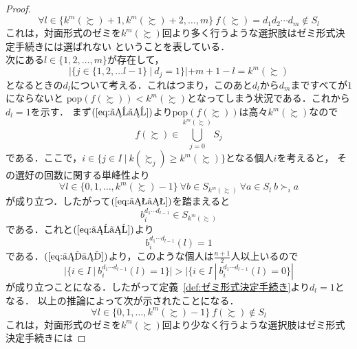 \documentclass[dvipdfmx]{jsarticle}
\begin{document}
\begin{proof}
\begin{equation}
    \forall l \in \{k^m(\succsim)+1,k^m(\succsim)+2, \ldots, m\} \ f(\succsim) = d_{1}d_{2}\cdots d_{m} \notin S_l
  \end{equation}
  これは，対面形式のゼミを$k^m(\succsim)$回より多く行うような選択肢はゼミ形式決定手続きには選ばれない
  ということを表している．\\
  次にある$l \in \{1,2,\ldots,m\}$が存在して，
  \begin{equation}\label{eq:ええ}
    |\{ j \in \{1,2,\ldots l-1\} \ | \ d_j=1 \}| + m + 1 - l = k^m(\succsim)
  \end{equation}
  となるときの$d_l$について考える．これはつまり，このあと$d_l$から$d_m$まですべてが$1$にならないと
  $\mathrm{pop}(f(\succsim)) < k^m(\succsim)$となってしまう状況である．これから$d_l=1$を示す．
  まず$(\ref{eq:ええ})$より$\mathrm{pop}(f(\succsim))$は高々$k^m(\succsim)$なので
  \begin{equation}\label{eq:おお}
    f(\succsim) \in \bigcup_{j=0}^{k^m(\succsim)}S_j
  \end{equation}
  である．ここで，$i \in \{j \in I \ | \ k(\succsim_j) \geq k^m(\succsim) \}$となる個人$i$を考えると，
  その選好の回数に関する単峰性より
  \begin{equation*}
    \forall l \in \{0,1,\ldots, k^m(\succsim)-1\}\ \forall b \in S_{k^m(\succsim)} \ 
    \forall a \in S_l \ b \succ_i a
  \end{equation*}
  が成り立つ．したがって$(\ref{eq:おお})$を踏まえると
  \begin{equation*}
    b_i^{d_{1}\cdots d_{l-1}} \in S_{k^m(\succsim)}
  \end{equation*}
  である．これと$(\ref{eq:ええ})$より
  \begin{equation*}
    b_i^{d_{1}\cdots d_{l-1}}(l) = 1
  \end{equation*}
  である．$(\ref{eq:いい})$より，このような個人は$\frac{n+1}{2}$人以上いるので
  \begin{equation*}
    |\{i \in I \ | \ b_{i}^{d_{1}\cdots d_{l-1}}(l) = 1 \}| >
    |\{i \in I \ | \ b_{i}^{d_{1}\cdots d_{l-1}}(l) = 0 \}|
  \end{equation*}
  が成り立つことになる．したがって定義~\ref{def:ゼミ形式決定手続き}より$d_l=1$となる．
  以上の推論によって次が示されたことになる．
  \begin{equation}\label{eq:B}
    \forall l \in \{0,1,\ldots, k^m(\succsim)-1\} \ f(\succsim) \notin S_l
  \end{equation}
  これは，対面形式のゼミを$k^m(\succsim)$回より少なく行うような選択肢はゼミ形式決定手続きには

\end{proof}
\end{document}
